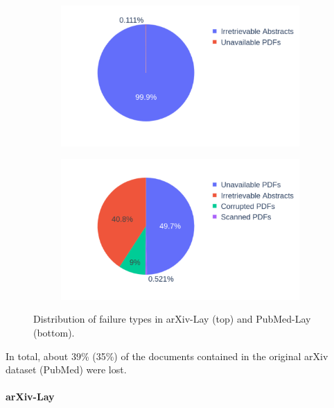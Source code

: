 \begin{figure}
    \centering
  \begin{subfigure}[b]{0.45\textwidth}
    \includegraphics[width=\textwidth]{images/chapter5/distribution_failure_types_arxiv.pdf}
  \end{subfigure}
  \begin{subfigure}[b]{0.45\textwidth}
    \includegraphics[width=\textwidth]{images/chapter5/distribution_failure_types_pubmed.pdf}
  \end{subfigure}
\caption{Distribution of failure types in arXiv-Lay (top) and PubMed-Lay (bottom).}
\label{fig:details-lost-docs}
\end{figure}

In total, about 39\% (35\%) of the documents contained in the original arXiv dataset (PubMed) were lost.

\paragraph{arXiv-Lay}

